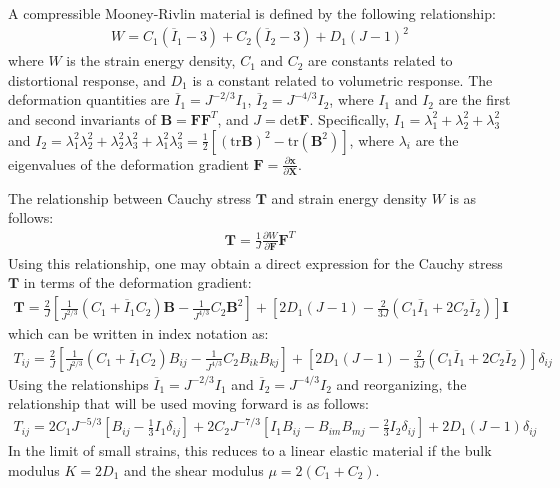 A compressible Mooney-Rivlin material is defined by the following relationship:
\begin{align}
W = C_1(\overline{I}_1 - 3) + C_2(\overline{I}_2 - 3) + D_1(J - 1)^2
\end{align}
where $W$ is the strain energy density, $C_1$ and $C_2$ are constants related to distortional response, and $D_1$ is a constant related to volumetric response. The deformation quantities are $\overline{I}_1 = J^{-2/3}I_1$, $\overline{I}_2 = J^{-4/3}I_2$, where $I_1$ and $I_2$ are the first and second invariants of $\bm{B} = {\bm F}{\bm F}^T$, and $J = \text{det}{\bm F}$. Specifically, $I_1 = \lambda_1^2 + \lambda_2^2 + \lambda_3^2$ and $I_2 = \lambda_1^2\lambda_2^2 + \lambda_2^2\lambda_3^2 + \lambda_1^2\lambda_3^2 = \frac{1}{2}[(\text{tr}{\bm B})^2 - \text{tr}({\bm B}^2)]$, where $\lambda_i$ are the eigenvalues of the deformation gradient ${\bm F} = \frac{\partial {\bm x}}{\partial {\bm X}}$.

The relationship between Cauchy stress ${\bm T}$ and strain energy density $W$ is as follows:
\begin{align}
{\bm T} = \frac{1}{J}\frac{\partial W}{\partial {\bm F}}{\bm F}^{T}
\end{align}
Using this relationship, one may obtain a direct expression for the Cauchy stress ${\bm T}$ in terms of the deformation gradient:
\begin{align}
{\bm T} = \frac{2}{J}\left[\frac{1}{J^{2/3}}(C_1 + \overline{I}_1{C_2}){\bm B} - \frac{1}{J^{4/3}}C_2{\bm B}^2\right] + \left[2D_1(J-1) - \frac{2}{3J}(C_1\overline{I}_1 + 2C_2\overline{I}_2)\right]{\bm I}
\end{align}
which can be written in index notation as:
\begin{align}
T_{ij} = \frac{2}{J}\left[\frac{1}{J^{2/3}}(C_1 + \overline{I}_{1}C_2)B_{ij} - \frac{1}{J^{4/3}}C_2B_{ik}B_{kj}\right] + \left[2D_1(J-1) - \frac{2}{3J}(C_1\overline{I}_{1} + 2C_2\overline{I}_{2})\right]\delta_{ij}
\end{align}
Using the relationships $\overline{I}_{1} = J^{-2/3}I_1$ and $\overline{I}_{2} = J^{-4/3}I_2$ and reorganizing, the relationship that will be used moving forward is as follows:
\begin{align}
\label{eq:stress}
T_{ij} = 2C_1J^{-5/3}\left[B_{ij} - \frac{1}{3}I_1\delta_{ij}\right] + 2C_2J^{-7/3}\left[I_1B_{ij} - B_{im}B_{mj} - \frac{2}{3}I_2\delta_{ij}\right] + 2D_1(J-1)\delta_{ij}
\end{align}
In the limit of small strains, this reduces to a linear elastic material if the bulk modulus $K = 2D_1$ and the shear modulus $\mu = 2(C_1 + C_2)$.


